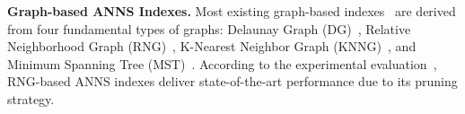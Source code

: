 
\noindent\textbf{Graph-based ANNS Indexes.} 
Most existing graph-based indexes~\cite{wang2021comprehensive,fu2019fast,liApproximateNearestNeighbor2020,DBLP:journals/pami/FuWC22,DBLP:journals/is/MalkovPLK14,DBLP:conf/cvpr/HarwoodD16,malkovEfficientRobustApproximate2020,harwood2016fanng,chen2018sptag,iwasaki2015neighborhood,DBLP:journals/pami/FuWC22} are derived from four fundamental types of graphs: Delaunay Graph (DG)~\cite{dgraph}, Relative Neighborhood Graph (RNG)~\cite{rng}, K-Nearest Neighbor Graph (KNNG)~\cite{knngraph}, and Minimum Spanning Tree (MST)~\cite{mst}. 
According to the experimental evaluation~\cite{wang2021comprehensive}, RNG-based ANNS indexes deliver state-of-the-art performance 
due to its pruning strategy. 


